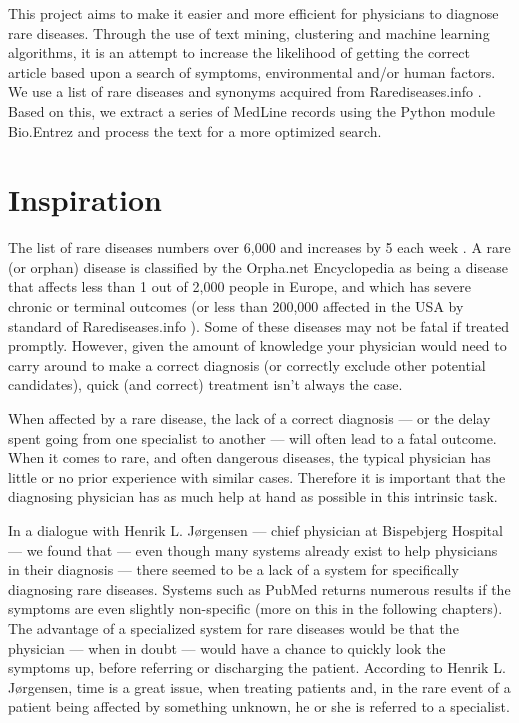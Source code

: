 This project aims to make it easier and more efficient for physicians
to diagnose rare diseases. Through the use of text mining,
clustering and machine learning algorithms, it is an attempt to
increase the likelihood of getting the correct article based upon a
search of symptoms, environmental and/or human factors. We use a list
of rare diseases and synonyms acquired from Rarediseases.info
\cite{Rarediseases}. Based on this, we
extract a series of MedLine records \cite{PubMedFactSheetMedline}
using the Python module Bio.Entrez \cite{EntrezProgUtil} and process
the text for a more optimized search.

\section{Inspiration}

The list of rare diseases numbers over 6,000 and increases by 5 each
week \cite{AboutRareDiseasesOrphanet}. A rare (or orphan) disease is
classified by the Orpha.net Encyclopedia \cite{OrphanetEncyclopedia}
as being a disease that affects less than 1 out of 2,000 people in
Europe, and which has severe chronic or terminal outcomes (or less
than 200,000 affected in the USA by standard of Rarediseases.info
\cite{Rarediseases}). Some of these  diseases may not be fatal if treated promptly. However,
given the amount of knowledge your physician would need to carry
around to make a correct diagnosis (or correctly exclude other
potential candidates), quick (and correct) treatment isn't always the case.

When affected by a rare disease, the lack of a correct diagnosis
--- or the delay spent going from one specialist to another --- will
often lead to a fatal outcome. When it comes to rare, and often
dangerous diseases, the typical physician has little or no prior
experience with similar cases. Therefore it is important that the
diagnosing physician has as much help at hand as possible in this
intrinsic task.

In a dialogue with Henrik L. J\o rgensen \cite{TheDude} --- chief
physician at Bispebjerg Hospital --- we found that --- even though
many systems already exist to help physicians in their diagnosis ---
there seemed to be a lack of a system for specifically diagnosing rare
diseases. Systems such as PubMed returns numerous results if the
symptoms are even slightly non-specific (more on this in the following
chapters). The advantage of a specialized system for rare diseases
would be that the physician --- when in doubt --- would have a chance
to quickly look the symptoms up, before referring or discharging the
patient. According to Henrik L. J\o rgensen, time is a great issue,
when treating patients and, in the rare event of a patient being
affected by something unknown, he or she is referred to a specialist.

